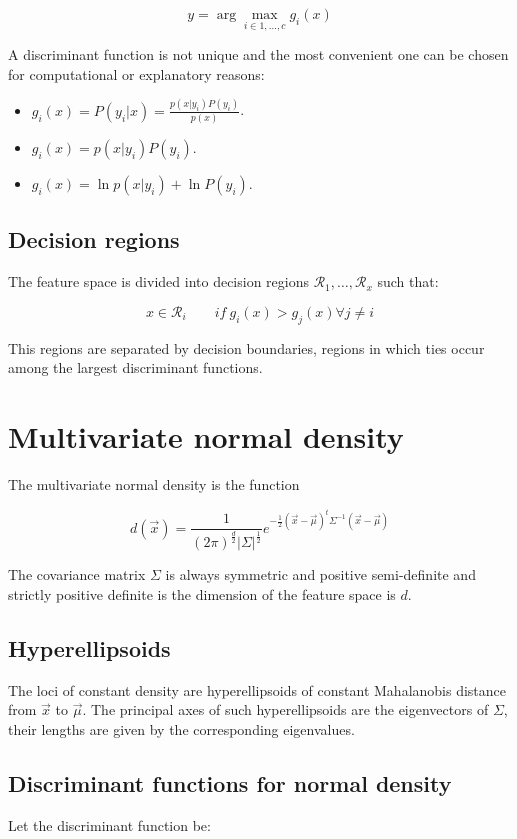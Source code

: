 	$$y = \arg\max\limits_{i\in 1, \dots, c}g_i(x)$$

	A discriminant function is not unique and the most convenient one can be chosen for computational or explanatory reasons:

	\begin{multicols}{2}
		\begin{itemize}
			\item $g_i(x) = P(y_i|x) = \frac{p(x|y_i)P(y_i)}{p(x)}$.
			\item $g_i(x) = p(x|y_i)P(y_i)$.
			\item $g_i(x) = \ln p(x|y_i) + \ln P(y_i)$.
		\end{itemize}
	\end{multicols}

	\subsection{Decision regions}
	The feature space is divided into decision regions $\mathcal{R}_1, \dots, \mathcal{R}_x$ such that:

	$$x\in\mathcal{R}_i\qquad if\ g_i(x)>g_j(x)\forall j\neq i$$

	This regions are separated by decision boundaries, regions in which ties occur among the largest discriminant functions.

\section{Multivariate normal density}
The multivariate normal density is the function

$$d(\vec{x}) = \frac{1}{(2\pi)^\frac{d}{2}|\Sigma|^{\frac{1}{2}}}e^{-\frac{1}{2}(\vec{x}-\vec{\mu})^t\Sigma^{-1}(\vec{x}-\vec{\mu})}$$

The covariance matrix $\Sigma$ is always symmetric and positive semi-definite and strictly positive definite is the dimension of the feature space is $d$.

	\subsection{Hyperellipsoids}
	The loci of constant density are hyperellipsoids of constant Mahalanobis distance from $\vec{x}$ to $\vec{\mu}$.
	The principal axes of such hyperellipsoids are the eigenvectors of $\Sigma$, their lengths are given by the corresponding eigenvalues.

	\subsection{Discriminant functions for normal density}
	Let the discriminant function be:

